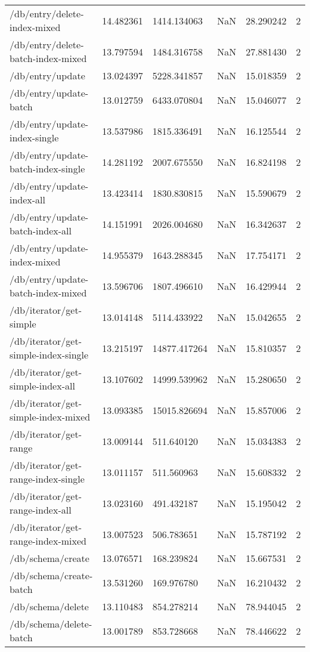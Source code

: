 \begin{tabularx}{\linewidth}{XXXXXX}
/db/entry/delete-index-mixed & 14.482361 & 1414.134063 & NaN & 28.290242 & 2 \\
/db/entry/delete-batch-index-mixed & 13.797594 & 1484.316758 & NaN & 27.881430 & 2 \\
/db/entry/update & 13.024397 & 5228.341857 & NaN & 15.018359 & 2 \\
/db/entry/update-batch & 13.012759 & 6433.070804 & NaN & 15.046077 & 2 \\
/db/entry/update-index-single & 13.537986 & 1815.336491 & NaN & 16.125544 & 2 \\
/db/entry/update-batch-index-single & 14.281192 & 2007.675550 & NaN & 16.824198 & 2 \\
/db/entry/update-index-all & 13.423414 & 1830.830815 & NaN & 15.590679 & 2 \\
/db/entry/update-batch-index-all & 14.151991 & 2026.004680 & NaN & 16.342637 & 2 \\
/db/entry/update-index-mixed & 14.955379 & 1643.288345 & NaN & 17.754171 & 2 \\
/db/entry/update-batch-index-mixed & 13.596706 & 1807.496610 & NaN & 16.429944 & 2 \\
/db/iterator/get-simple & 13.014148 & 5114.433922 & NaN & 15.042655 & 2 \\
/db/iterator/get-simple-index-single & 13.215197 & 14877.417264 & NaN & 15.810357 & 2 \\
/db/iterator/get-simple-index-all & 13.107602 & 14999.539962 & NaN & 15.280650 & 2 \\
/db/iterator/get-simple-index-mixed & 13.093385 & 15015.826694 & NaN & 15.857006 & 2 \\
/db/iterator/get-range & 13.009144 & 511.640120 & NaN & 15.034383 & 2 \\
/db/iterator/get-range-index-single & 13.011157 & 511.560963 & NaN & 15.608332 & 2 \\
/db/iterator/get-range-index-all & 13.023160 & 491.432187 & NaN & 15.195042 & 2 \\
/db/iterator/get-range-index-mixed & 13.007523 & 506.783651 & NaN & 15.787192 & 2 \\
/db/schema/create & 13.076571 & 168.239824 & NaN & 15.667531 & 2 \\
/db/schema/create-batch & 13.531260 & 169.976780 & NaN & 16.210432 & 2 \\
/db/schema/delete & 13.110483 & 854.278214 & NaN & 78.944045 & 2 \\
/db/schema/delete-batch & 13.001789 & 853.728668 & NaN & 78.446622 & 2 \\

\end{tabularx}
